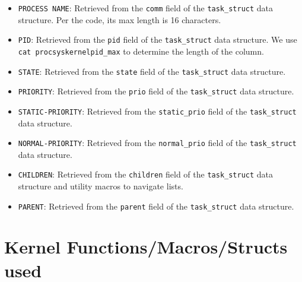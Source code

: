 \documentclass{article}
\begin{document}
\begin{itemize}
  \item \texttt{PROCESS NAME}: Retrieved from the \texttt{comm} field of the \texttt{task\_struct} data structure. Per the code, its max length is 16 characters.
  \item \texttt{PID}: Retrieved from the \texttt{pid} field of the \texttt{task\_struct} data structure. We use \texttt{cat \/proc\/sys\/kernel\/pid\_max} to determine the length of the column.
  \item \texttt{STATE}: Retrieved from the \texttt{state} field of the \texttt{task\_struct} data structure.
  \item \texttt{PRIORITY}: Retrieved from the \texttt{prio} field of the \texttt{task\_struct} data structure.
  \item \texttt{STATIC-PRIORITY}: Retrieved from the \texttt{static\_prio} field of the \texttt{task\_struct} data structure.
  \item \texttt{NORMAL-PRIORITY}: Retrieved from the \texttt{normal\_prio} field of the \texttt{task\_struct} data structure.
  \item \texttt{CHILDREN}: Retrieved from the \texttt{children} field of the \texttt{task\_struct} data structure and utility macros to navigate lists.
  \item \texttt{PARENT}: Retrieved from the \texttt{parent} field of the \texttt{task\_struct} data structure.
\end{itemize}

\section{Kernel Functions/Macros/Structs used}


\end{document}
